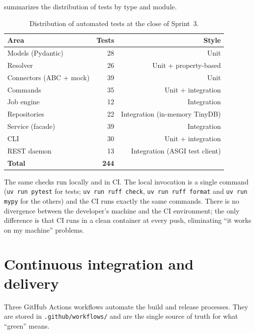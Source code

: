  summarizes the distribution of tests by
type and module.

\begin{table}[ht]
  \centering
  \small
  \begin{tabular}{l r r}
    \toprule
    \textbf{Area} & \textbf{Tests} & \textbf{Style} \\
    \midrule
    Models (Pydantic)           & 28 & Unit \\
    Resolver                    & 26 & Unit + property-based \\
    Connectors (ABC + mock)     & 39 & Unit \\
    Commands                    & 35 & Unit + integration \\
    Job engine                  & 12 & Integration \\
    Repositories                & 22 & Integration (in-memory TinyDB) \\
    Service (facade)            & 39 & Integration \\
    CLI                         & 30 & Unit + integration \\
    REST daemon                 & 13 & Integration (ASGI test client) \\
    \midrule
    \textbf{Total}              & \textbf{244} & \\
    \bottomrule
  \end{tabular}
  \caption{Distribution of automated tests at the close of Sprint~3.}
  \label{tab:test-distribution}
\end{table}

The same checks run locally and in CI. The local invocation is a
single command (\texttt{uv run pytest} for tests; \texttt{uv run
ruff check}, \texttt{uv run ruff format} and \texttt{uv run mypy} for
the others) and the CI runs exactly the same commands. There is no
divergence between the developer's machine and the CI environment;
the only difference is that CI runs in a clean container at every
push, eliminating ``it works on my machine'' problems.

\section{Continuous integration and delivery}
\label{sec:cicd}

Three GitHub Actions workflows automate the build and release
processes. They are stored in \texttt{.github/workflows/} and are
the single source of truth for what ``green'' means.

